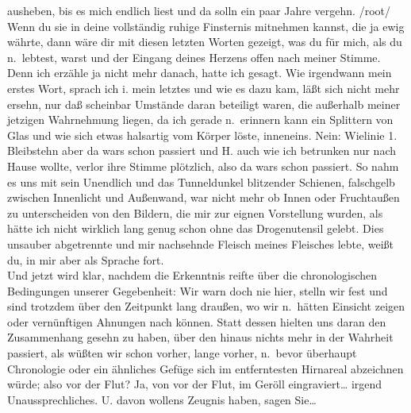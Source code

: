 \documentclass[
]{article}
\begin{document}
ausheben, bis es mich endlich liest und da solln ein paar Jahre vergehn.
/root/\\
Wenn du sie in deine vollständig ruhige Finsternis mitnehmen kannst, die
ja ewig währte, dann wäre dir mit diesen letzten Worten gezeigt, was du
für mich, als du n.~lebtest, warst und der Eingang deines Herzens offen
nach meiner Stimme. Denn ich erzähle ja nicht mehr danach, hatte ich
gesagt. Wie irgendwann mein erstes Wort, sprach ich i. mein letztes und
wie es dazu kam, läßt sich nicht mehr ersehn, nur daß scheinbar Umstände
daran beteiligt waren, die außerhalb meiner jetzigen Wahrnehmung liegen,
da ich gerade n.~erinnern kann ein Splittern von Glas und wie sich etwas
halsartig vom Körper löste, inneneins. Nein: Wielinie 1. Bleibstehn aber
da wars schon passiert und H. auch wie ich betrunken nur nach Hause
wollte, verlor ihre Stimme plötzlich, also da wars schon passiert. So
nahm es uns mit sein Unendlich und das Tunneldunkel blitzender Schienen,
falschgelb zwischen Innenlicht und Außenwand, war nicht mehr ob Innen
oder Fruchtaußen zu unterscheiden von den Bildern, die mir zur eignen
Vorstellung wurden, als hätte ich nicht wirklich lang genug schon ohne
das Drogenutensil gelebt. Dies unsauber abgetrennte und mir nachsehnde
Fleisch meines Fleisches lebte, weißt du, in mir aber als Sprache
fort.\\
Und jetzt wird klar, nachdem die Erkenntnis reifte über die
chronologischen Bedingungen unserer Gegebenheit: Wir warn doch nie hier,
stelln wir fest und sind trotzdem über den Zeitpunkt lang draußen, wo
wir n.~hätten Einsicht zeigen oder vernünftigen Ahnungen nach können.
Statt dessen hielten uns daran den Zusammenhang gesehn zu haben, über
den hinaus nichts mehr in der Wahrheit passiert, als wüßten wir schon
vorher, lange vorher, n.~bevor überhaupt Chronologie oder ein ähnliches
Gefüge sich im entferntesten Hirnareal abzeichnen würde; also vor der
Flut? Ja, von vor der Flut, im Geröll eingraviert\ldots{} irgend
Unaussprechliches. U. davon wollens Zeugnis haben, sagen Sie\ldots{}
\end{document}
